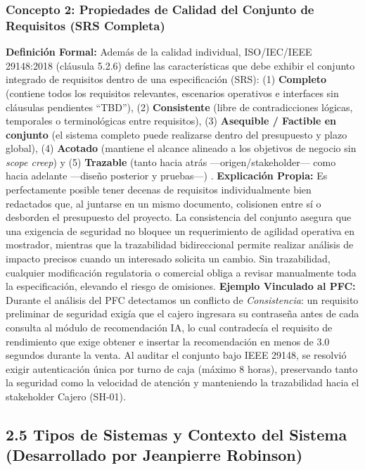 \documentclass[conference,10pt]{IEEEtran}
\begin{document}
	\subsubsection{Concepto 2: Propiedades de Calidad del Conjunto de Requisitos (SRS Completa)}
	\textbf{Definición Formal:} Además de la calidad individual, ISO/IEC/IEEE 29148:2018 (cláusula 5.2.6) define las características que debe exhibir el conjunto integrado de requisitos dentro de una especificación (SRS): (1) \textbf{Completo} (contiene todos los requisitos relevantes, escenarios operativos e interfaces sin cláusulas pendientes ``TBD''), (2) \textbf{Consistente} (libre de contradicciones lógicas, temporales o terminológicas entre requisitos), (3) \textbf{Asequible / Factible en conjunto} (el sistema completo puede realizarse dentro del presupuesto y plazo global), (4) \textbf{Acotado} (mantiene el alcance alineado a los objetivos de negocio sin \textit{scope creep}) y (5) \textbf{Trazable} (tanto hacia atrás —origen/stakeholder— como hacia adelante —diseño posterior y pruebas—) \cite{ieee29148, swebok2024}.
	\textbf{Explicación Propia:} Es perfectamente posible tener decenas de requisitos individualmente bien redactados que, al juntarse en un mismo documento, colisionen entre sí o desborden el presupuesto del proyecto. La consistencia del conjunto asegura que una exigencia de seguridad no bloquee un requerimiento de agilidad operativa en mostrador, mientras que la trazabilidad bidireccional permite realizar análisis de impacto precisos cuando un interesado solicita un cambio. Sin trazabilidad, cualquier modificación regulatoria o comercial obliga a revisar manualmente toda la especificación, elevando el riesgo de omisiones.
	\textbf{Ejemplo Vinculado al PFC:} Durante el análisis del PFC detectamos un conflicto de \textit{Consistencia}: un requisito preliminar de seguridad exigía que el cajero ingresara su contraseña antes de cada consulta al módulo de recomendación IA, lo cual contradecía el requisito de rendimiento que exige obtener e insertar la recomendación en menos de 3.0 segundos durante la venta. Al auditar el conjunto bajo IEEE 29148, se resolvió exigir autenticación única por turno de caja (máximo 8 horas), preservando tanto la seguridad como la velocidad de atención y manteniendo la trazabilidad hacia el stakeholder Cajero (SH-01).
	\subsection{2.5 Tipos de Sistemas y Contexto del Sistema (Desarrollado por Jeanpierre Robinson)}
\end{document}
